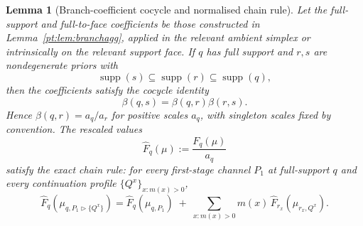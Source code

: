 \documentclass[11pt,a4paper]{article}
\newtheorem{lemma}[theorem]{Lemma}
\theoremstyle{definition}
\newcommand{\1}{\mathbf 1}
\begin{document}
\begin{lemma}[Branch-coefficient cocycle and normalised chain rule]\label{pt:lem:chain}
Let the full-support and full-to-face coefficients be those constructed in Lemma~\ref{pt:lem:branchagg}, applied in the
relevant ambient simplex or intrinsically on the relevant support face.  If $q$ has full support and $r,s$ are
nondegenerate priors with
\[
\operatorname{supp}(s)\subseteq\operatorname{supp}(r)\subseteq\operatorname{supp}(q),
\]
then the coefficients satisfy the cocycle identity
\[
\beta(q,s)=\beta(q,r)\beta(r,s).
\]
Hence $\beta(q,r)=a_q/a_r$ for positive scales $a_q$, with singleton scales fixed by convention.  The rescaled values
\[
\widehat F_q(\mu):=\frac{F_q(\mu)}{a_q}
\]
satisfy the exact chain rule: for every first-stage channel $P_1$ at full-support $q$ and every continuation profile
$\{Q^x\}_{x:m(x)>0}$,
\[
\widehat F_q(\mu_{q,P_1\triangleright\{Q^x\}})
=
\widehat F_q(\mu_{q,P_1})
\;+\;
\sum_{x:m(x)>0}m(x)\,\widehat F_{r_x}(\mu_{r_x,Q^x}).
\]
\end{lemma}
\end{document}

